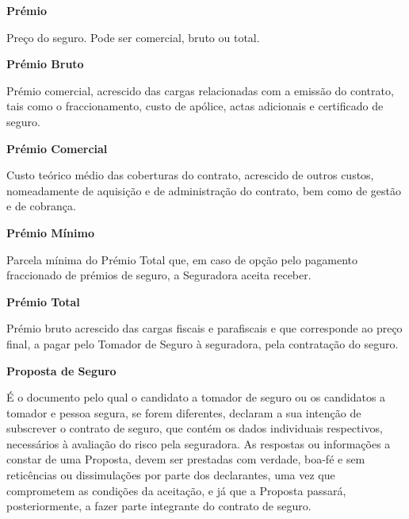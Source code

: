 \begin{description}
\item \textbf{Prémio}

Preço do seguro. Pode ser comercial, bruto ou total.
\end{description}

\begin{description}
\item \textbf{Prémio Bruto}

Prémio comercial, acrescido das cargas relacionadas com a emissão do contrato, tais como o fraccionamento, custo de apólice, actas adicionais e certificado de seguro.
\end{description}

\begin{description}
\item \textbf{Prémio Comercial}

Custo teórico médio das coberturas do contrato, acrescido de outros custos, nomeadamente de aquisição e de administração do contrato, bem como de gestão e de cobrança.
\end{description}

\begin{description}
\item \textbf{Prémio Mínimo}

Parcela mínima do Prémio Total que, em caso de opção pelo pagamento fraccionado de prémios de seguro, a Seguradora aceita receber.
\end{description}

\begin{description}
\item \textbf{Prémio Total}

Prémio bruto acrescido das cargas fiscais e parafiscais e que corresponde ao preço final, a pagar pelo Tomador de Seguro à seguradora, pela contratação do seguro.
\end{description}

\begin{description}
\item \textbf{Proposta de Seguro}

É o documento pelo qual o candidato a tomador de seguro ou os candidatos a tomador e pessoa segura, se forem diferentes, declaram a sua intenção de subscrever o contrato de seguro, que contém os dados individuais respectivos, necessários à avaliação do risco pela seguradora. As respostas ou informações a constar de uma Proposta, devem ser prestadas com verdade, boa-fé e sem reticências ou dissimulações por parte dos declarantes, uma vez que comprometem as condições da aceitação, e já que a Proposta passará, posteriormente, a fazer parte integrante do contrato de seguro.
\end{description}


